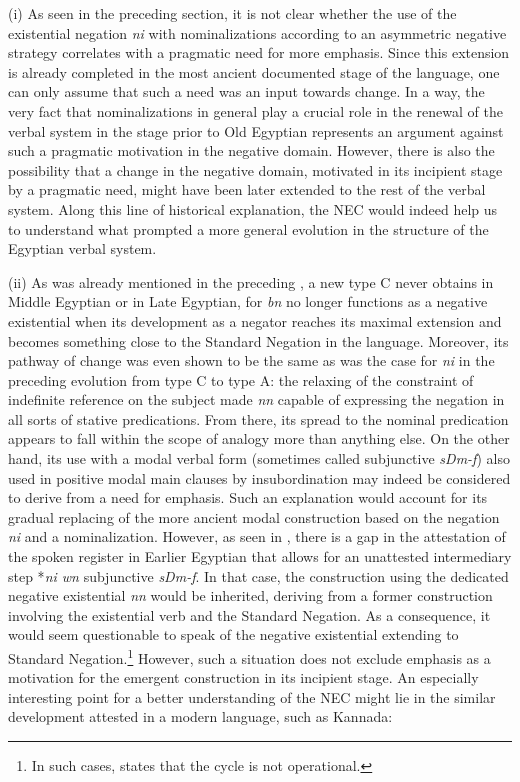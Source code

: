 \documentclass[output=paper]{langsci/langscibook}
\newcommand{\ꜥ}{ʿ}
\newcommand{\ꜣ}{\kern-.25pt\texttt{ꜣ}\kern-.6pt}
\begin{document}
(i) As seen in the preceding section, it is not clear whether the use of the existential negation \textit{ni} with nominalizations according to an asymmetric negative strategy correlates with a pragmatic need for more emphasis. Since this extension is already completed in the most ancient documented stage of the language, one can only assume that such a need was an input towards change. In a way, the very fact that nominalizations in general play a crucial role in the renewal of the verbal system in the stage prior to Old Egyptian represents an argument against such a pragmatic motivation in the negative domain. However, there is also the possibility that a change in the negative domain, motivated in its incipient stage by a pragmatic need, might have been later extended to the rest of the verbal system. Along this line of historical explanation, the NEC would indeed help us to understand what prompted a more general evolution in the structure of the Egyptian verbal system.

(ii) As was already mentioned in the preceding , a new type C never obtains in Middle Egyptian or in Late Egyptian, for \textit{bn} no longer functions as a negative existential when its development as a negator reaches its maximal extension and becomes something close to the Standard Negation in the language. Moreover, its pathway of change was even shown to be the same as was the case for \textit{ni} in the preceding evolution from type C to type A: the relaxing of the constraint of indefinite reference on the subject made \textit{nn} capable of expressing the negation in all sorts of stative predications. From there, its spread to the nominal predication appears to fall within the scope of analogy more than anything else. On the other hand, its use with a modal verbal form (sometimes called subjunctive \textit{sDm-f}) also used in positive modal main clauses by insubordination may indeed be considered to derive from a need for emphasis. Such an explanation would account for its gradual replacing of the more ancient modal construction based on the negation \textit{ni} and a nominalization. However, as seen in , there is a gap in the attestation of the spoken register in Earlier Egyptian that allows for an unattested intermediary step *\textit{ni wn} subjunctive \textit{sDm-f}. In that case, the construction using the dedicated negative existential \textit{nn} would be inherited, deriving from a former construction involving the existential verb and the Standard Negation. As a consequence, it would seem questionable to speak of the negative existential extending to Standard Negation.\footnote{In such cases, \citet{Veselinova2014} states that the cycle is not operational.}
However, such a situation does not exclude emphasis as a motivation for the emergent construction in its incipient stage. An especially interesting point for a better understanding of the NEC might lie in the similar development attested in a modern language, such as Kannada:
\end{document}
